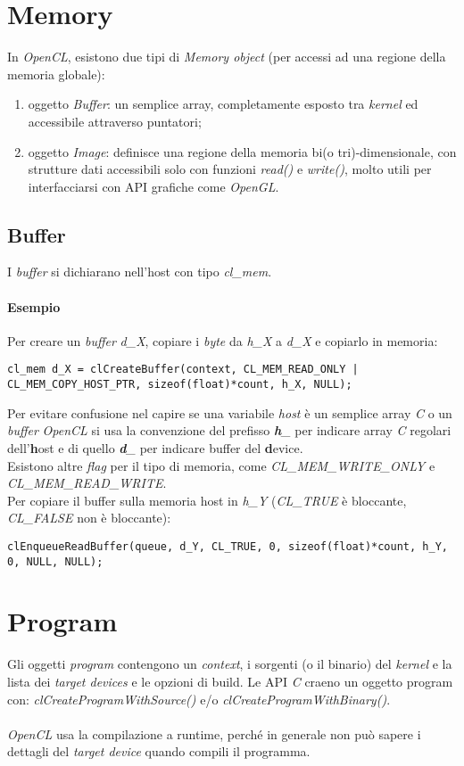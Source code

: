 \section{Memory}
In \textit{OpenCL}, esistono due tipi di \textit{Memory object} (per accessi ad una regione della memoria globale):
\begin{enumerate}
	\item oggetto \textit{Buffer}: un semplice array, completamente esposto tra \textit{kernel} ed accessibile attraverso puntatori;
	\item oggetto \textit{Image}: definisce una regione della memoria bi(o tri)-dimensionale, con strutture dati accessibili solo con funzioni \textit{read()} e \textit{write()}, molto utili per interfacciarsi con API grafiche come \textit{OpenGL}.
\end{enumerate}
\subsection{Buffer}
I \textit{buffer} si dichiarano nell'host con tipo \textit{cl\_mem}.
\paragraph{Esempio}
Per creare un \textit{buffer} \textit{d\_X}, copiare i \textit{byte} da \textit{h\_X} a \textit{d\_X} e copiarlo in memoria:
\begin{lstlisting}
cl_mem d_X = clCreateBuffer(context, CL_MEM_READ_ONLY | CL_MEM_COPY_HOST_PTR, sizeof(float)*count, h_X, NULL);
\end{lstlisting}
Per evitare confusione nel capire se una variabile \textit{host} è un semplice array \textit{C} o un \textit{buffer} \textit{OpenCL} si usa la convenzione del prefisso \textit{\textbf{h}\_} per indicare array \textit{C} regolari dell'\textbf{h}ost e di quello \textit{\textbf{d}\_} per indicare buffer del \textbf{d}evice. \\
Esistono altre \textit{flag} per il tipo di memoria, come \textit{CL\_MEM\_WRITE\_ONLY} e \textit{CL\_MEM\_READ\_WRITE}. \\
Per copiare il buffer sulla memoria host in \textit{h\_Y} (\textit{CL\_TRUE} è bloccante, \textit{CL\_FALSE} non è bloccante):
\begin{lstlisting}
clEnqueueReadBuffer(queue, d_Y, CL_TRUE, 0, sizeof(float)*count, h_Y, 0, NULL, NULL);
\end{lstlisting}

\section{Program}
Gli oggetti \textit{program} contengono un \textit{context}, i sorgenti (o il binario) del \textit{kernel} e la lista dei \textit{target devices} e le opzioni di build. Le API \textit{C} craeno un oggetto program con: \textit{clCreateProgramWithSource()} e/o \textit{clCreateProgramWithBinary()}. \\\\
\textit{OpenCL} usa la compilazione a runtime, perché in generale non può sapere i dettagli del \textit{target device} quando compili il programma.
